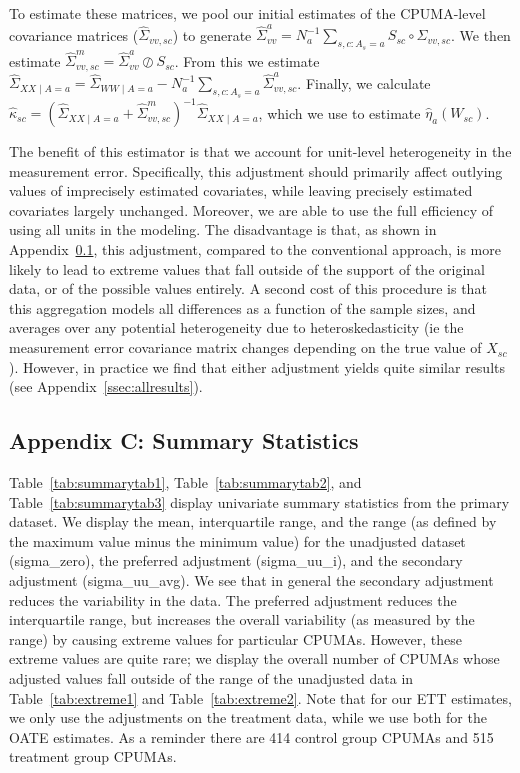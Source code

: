 \documentclass[12pt]{article}
\begin{document}
To estimate these matrices, we pool our initial estimates of the CPUMA-level covariance matrices ($\hat{\Sigma}_{vv, sc}$) to generate $\hat{\Sigma}_{vv}^a = N_a^{-1}\sum_{s, c: A_s = a} S_{sc} \circ \Sigma_{vv, sc}$. We then estimate $\hat{\Sigma}_{vv, sc}^m = \hat{\Sigma}_{vv}^a \oslash S_{sc}$. From this we estimate $\hat{\Sigma}_{XX \mid A = a} = \hat{\Sigma}_{WW \mid A = a} - N_a^{-1}\sum_{s, c: A_s = a}\hat{\Sigma}_{vv, sc}^a$. Finally, we calculate $\hat{\kappa}_{sc} = (\hat{\Sigma}_{XX \mid A = a} + \hat{\Sigma}_{vv, sc}^m)^{-1}\hat{\Sigma}_{XX \mid A = a}$, which we use to estimate $\hat{\eta}_a(W_{sc})$. 

The benefit of this estimator is that we account for unit-level heterogeneity in the measurement error. Specifically, this adjustment should primarily affect outlying values of imprecisely estimated covariates, while leaving precisely estimated covariates largely unchanged. Moreover, we are able to use the full efficiency of using all units in the modeling. The disadvantage is that, as shown in Appendix~\ref{sec:appendixsumstat}, this adjustment, compared to the conventional approach, is more likely to lead to extreme values that fall outside of the support of the original data, or of the possible values entirely. A second cost of this procedure is that this aggregation models all differences as a function of the sample sizes, and averages over any potential heterogeneity due to heteroskedasticity (ie the measurement error covariance matrix changes depending on the true value of $X_{sc}$). However, in practice we find that either adjustment yields quite similar results (see Appendix~\ref{ssec:allresults}).

\subsection{Appendix C: Summary Statistics}
\label{sec:appendixsumstat}

Table~\ref{tab:summarytab1}, Table~\ref{tab:summarytab2}, and Table~\ref{tab:summarytab3} display univariate summary statistics from the primary dataset. We display the mean, interquartile range, and the range (as defined by the maximum value minus the minimum value) for the unadjusted dataset (sigma\_zero), the preferred adjustment (sigma\_uu\_i), and the secondary adjustment (sigma\_uu\_avg). We see that in general the secondary adjustment reduces the variability in the data. The preferred adjustment reduces the interquartile range, but increases the overall variability (as measured by the range) by causing extreme values for particular CPUMAs. However, these extreme values are quite rare; we display the overall number of CPUMAs whose adjusted values fall outside of the range of the unadjusted data in Table~\ref{tab:extreme1} and Table~\ref{tab:extreme2}. Note that for our ETT estimates, we only use the adjustments on the treatment data, while we use both for the OATE estimates. As a reminder there are 414 control group CPUMAs and 515 treatment group CPUMAs.
\end{document}
